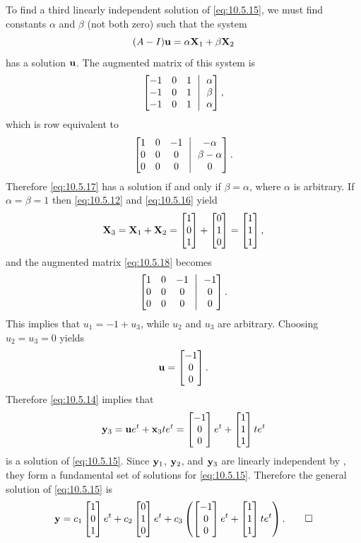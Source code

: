 \begin{solution}
To find a third linearly independent solution of  \eqref{eq:10.5.15}, we
must
find constants $\alpha$  and $\beta$ (not both zero) such that the system
\begin{equation}\label{eq:10.5.17}
(A-I)\mathbf{u}=\alpha\mathbf{X}_1+\beta\mathbf{X}_2
\end{equation}
has a solution $\mathbf{u}$. The augmented matrix of this system is
\[
\amatrix{-1&0&1\\-1&0&1\\-1&0&1}{\alpha\\\beta\\\alpha},
\]
which is row equivalent to
\begin{equation}\label{eq:10.5.18}
\amatrix{1&0&-1\\0&0&0\\0&0&0}{-\alpha\\\beta-\alpha\\0}.
\end{equation}
Therefore \eqref{eq:10.5.17} has a solution if and only if
$\beta=\alpha$, where $\alpha$ is arbitrary. If
$\alpha=\beta=1$ then \eqref{eq:10.5.12} and \eqref{eq:10.5.16} yield
\[
\mathbf{X}_3=\mathbf{X}_1+\mathbf{X}_2=
\begin{bmatrix}1\\0\\1\end{bmatrix}+\begin{bmatrix}0\\1\\0\end{bmatrix}=\begin{bmatrix}1\\1\\1\end{bmatrix},
\]
and the augmented matrix \eqref{eq:10.5.18}  becomes
\[
\amatrix{1&0&-1\\0&0&0\\0&0&0}{-1\\0\\0}.
\]
This implies that $u_1=-1+u_3$, while  $u_2$  and $u_3$ are arbitrary.
Choosing $u_2=u_3=0$  yields
\[
\mathbf{u}=\begin{bmatrix}-1\\0\\0\end{bmatrix}.
\]
 Therefore \eqref{eq:10.5.14} implies that
\[
\mathbf{y}_3=\mathbf{u}e^t+\mathbf{x}_3te^t=\begin{bmatrix}-1\\0\\0\end{bmatrix}e^t+\begin{bmatrix}1\\1\\1\end{bmatrix}te^t
\]
is a solution of  \eqref{eq:10.5.15}. Since $\mathbf{y}_1$, $\mathbf{y}_2$, and
$\mathbf{y}_3$ are linearly independent by ,
they form a fundamental set of solutions for \eqref{eq:10.5.15}.
Therefore the general solution of \eqref{eq:10.5.15} is
\[
\mathbf{y}=c_1\begin{bmatrix}1\\0\\1\end{bmatrix}e^t+c_2\begin{bmatrix}0\\1\\0\end{bmatrix}e^t
+c_3\left(\begin{bmatrix}-1\\0\\0\end{bmatrix}e^t+\begin{bmatrix}1\\1\\1\end{bmatrix}te^t\right).\qedhere
\]
\end{solution}



